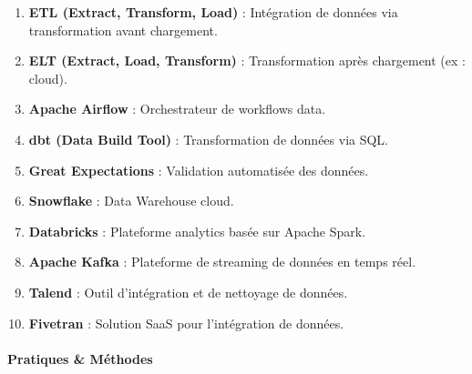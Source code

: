\documentclass[
  letterpaper,
  DIV=11,
  numbers=noendperiod]{scrartcl}
\makeatletter
\let\oldparagraph\paragraph
\renewcommand{\paragraph}{
    \@ifstar
      \xxxParagraphStar
      \xxxParagraphNoStar
  }
\newcommand{\xxxParagraphStar}[1]{\oldparagraph*{#1}\mbox{}}
\newcommand{\xxxParagraphNoStar}[1]{\oldparagraph{#1}\mbox{}}
\providecommand{\tightlist}{%
  \setlength{\itemsep}{0pt}\setlength{\parskip}{0pt}}\usepackage{longtable,booktabs,array}
\makeatother
\begin{document}
\begin{enumerate}
\def\labelenumi{\arabic{enumi}.}
\setcounter{enumi}{10}
\tightlist
\item
  \textbf{ETL (Extract, Transform, Load)} : Intégration de données via
  transformation avant chargement.\\
\item
  \textbf{ELT (Extract, Load, Transform)} : Transformation après
  chargement (ex : cloud).\\
\item
  \textbf{Apache Airflow} : Orchestrateur de workflows data.\\
\item
  \textbf{dbt (Data Build Tool)} : Transformation de données via SQL.\\
\item
  \textbf{Great Expectations} : Validation automatisée des données.\\
\item
  \textbf{Snowflake} : Data Warehouse cloud.\\
\item
  \textbf{Databricks} : Plateforme analytics basée sur Apache Spark.\\
\item
  \textbf{Apache Kafka} : Plateforme de streaming de données en temps
  réel.\\
\item
  \textbf{Talend} : Outil d'intégration et de nettoyage de données.\\
\item
  \textbf{Fivetran} : Solution SaaS pour l'intégration de données.
\end{enumerate}

\paragraph{\texorpdfstring{\textbf{Pratiques \&
Méthodes}}{Pratiques \& Méthodes}}\label{pratiques-muxe9thodes}
\end{document}
